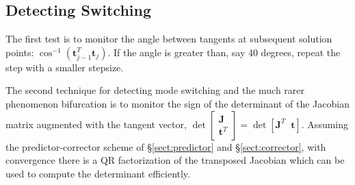 \documentclass[10pt,openany,twoside]{book}
\numberwithin{equation}{section}   %
\newcommand{\Matrix}[1]{\boldsymbol{#1}}
\newcommand{\Vector}[1]{\boldsymbol{#1}}
\newcommand{\Sectref}[1]{\S\ref{#1}}
\begin{document}
\subsection{Detecting Switching}
The first test is to monitor the angle between tangents at subsequent
solution points: $\cos^{-1}\left(\Vector{t}_{j-1}^T\Vector{t}_j\right)$.
If the angle is greater than, say 40 degrees, repeat the step with a
smaller stepsize.

The second technique for detecting mode switching and the much rarer phenomenon
bifurcation is to monitor the sign of the determinant of the
Jacobian matrix augmented with the tangent vector,
 
	$\det \left[ \begin{array}{c}
		\Matrix{J} \\
		\Vector{t}^T
	\end{array} \right] =
	\det \left[
		\Matrix{J}^T \;\; \Vector{t}
	\right]$.
Assuming the predictor-corrector scheme of \Sectref{sect:predictor}
and \Sectref{sect:corrector}, with convergence there is a QR factorization
of the transposed Jacobian which can be used to compute the determinant
efficiently.
\end{document}
